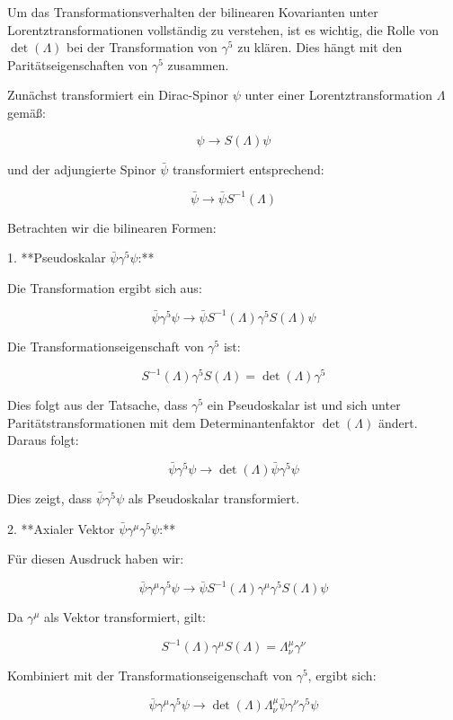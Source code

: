 Um das Transformationsverhalten der bilinearen Kovarianten unter Lorentztransformationen vollständig zu verstehen, ist es wichtig, die Rolle von \(\operatorname{det}(\Lambda)\) bei der Transformation von \(\gamma^5\) zu klären. Dies hängt mit den Paritätseigenschaften von \(\gamma^5\) zusammen.

Zunächst transformiert ein Dirac-Spinor \(\psi\) unter einer Lorentztransformation \(\Lambda\) gemäß:

\[
\psi \rightarrow S(\Lambda) \psi
\]

und der adjungierte Spinor \(\bar{\psi}\) transformiert entsprechend:

\[
\bar{\psi} \rightarrow \bar{\psi} S^{-1}(\Lambda)
\]

Betrachten wir die bilinearen Formen:

1. **Pseudoskalar \(\bar{\psi} \gamma^5 \psi\):**

Die Transformation ergibt sich aus:

\[
\bar{\psi} \gamma^5 \psi \rightarrow \bar{\psi} S^{-1}(\Lambda) \gamma^5 S(\Lambda) \psi
\]

Die Transformationseigenschaft von \(\gamma^5\) ist:

\[
S^{-1}(\Lambda) \gamma^5 S(\Lambda) = \operatorname{det}(\Lambda) \gamma^5
\]

Dies folgt aus der Tatsache, dass \(\gamma^5\) ein Pseudoskalar ist und sich unter Paritätstransformationen mit dem Determinantenfaktor \(\operatorname{det}(\Lambda)\) ändert. Daraus folgt:

\[
\bar{\psi} \gamma^5 \psi \rightarrow \operatorname{det}(\Lambda) \bar{\psi} \gamma^5 \psi
\]

Dies zeigt, dass \(\bar{\psi} \gamma^5 \psi\) als Pseudoskalar transformiert.

2. **Axialer Vektor \(\bar{\psi} \gamma^\mu \gamma^5 \psi\):**

Für diesen Ausdruck haben wir:

\[
\bar{\psi} \gamma^\mu \gamma^5 \psi \rightarrow \bar{\psi} S^{-1}(\Lambda) \gamma^\mu \gamma^5 S(\Lambda) \psi
\]

Da \(\gamma^\mu\) als Vektor transformiert, gilt:

\[
S^{-1}(\Lambda) \gamma^\mu S(\Lambda) = \Lambda_\nu^\mu \gamma^\nu
\]

Kombiniert mit der Transformationseigenschaft von \(\gamma^5\), ergibt sich:

\[
\bar{\psi} \gamma^\mu \gamma^5 \psi \rightarrow \operatorname{det}(\Lambda) \Lambda_\nu^\mu \bar{\psi} \gamma^\nu \gamma^5 \psi
\]

